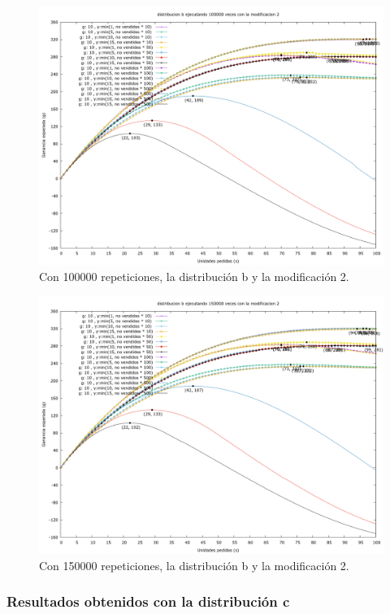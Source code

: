\documentclass[12pt, spanish]{article}
\begin{document}
\begin{figure}[H]
	\centering
	\includegraphics[scale = 0.3]{prob_b/datos_b_100000_2.png}
	\caption{Con 100000 repeticiones, la distribución b y la modificación 2.}
	\label{fig:ej1_a_100000}

\end{figure}

\begin{figure}[H]
	\centering
	\includegraphics[scale = 0.3]{prob_b/datos_b_150000_2.png}
	\caption{Con 150000 repeticiones, la distribución b y la modificación 2.}
	\label{fig:ej1_a_150000}

\end{figure}

\subsubsection{Resultados obtenidos con la distribución c}
\end{document}
